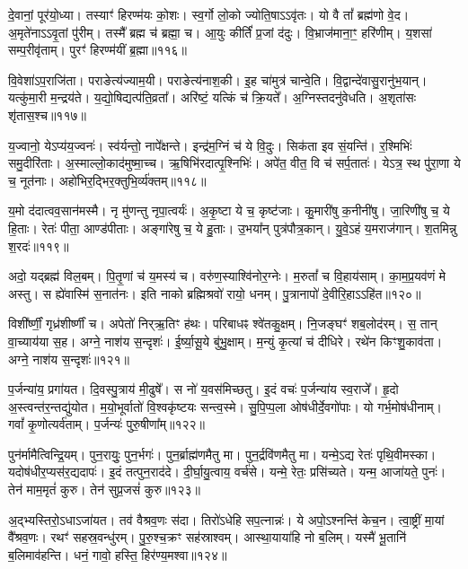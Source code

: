 दे॒वानां॒ पूर॑यो॒ध्या। तस्याꣳ॑ हिरण्म॑यः को॒शः। 
स्व॒र्गो लो॒को ज्योति॒षाऽऽवृ॑तः। यो वै तां᳚ ब्रह्म॑णो वे॒द। 
अ॒मृते॑नाऽऽवृ॒तां पु॑रीम्। तस्मै᳚ ब्रह्म च॑ ब्रह्मा॒ च। 
आ॒युः कीर्तिं॑ प्र॒जां द॑दुः। वि॒भ्राज॑माना॒ꣳ॒ हरि॑णीम्। 
य॒शसा॑ सम्प॒रीवृ॑ताम्। पुरꣳ॑ हिरण्म॑यीं ब्र॒ह्मा॥११६॥


वि॒वेशा॑ऽप॒राजि॑ता। पराङेत्य॑ज्याम॒यी। 
पराङेत्य॑नाश॒की। इ॒ह चा॑मुत्र॑ चान्वे॒ति। 
वि॒द्वान्दे॑वासु॒रानु॑भ॒यान्। यत्कु॑मा॒री म॒न्द्रय॑ते। 
य॒द्यो॒षिद्यत्प॑ति॒व्रता᳚। अरि॑ष्टं॒ यत्किं च॑ क्रि॒यते᳚। 
अ॒ग्निस्तदनु॑वेधति। अ॒शृता॑सः शृ॑तास॒श्च॥११७॥


य॒ज्वानो॒ येऽप्य॑य॒ज्वनः॑। स्व॑र्यन्तो॒ नापे᳚क्षन्ते। 
इन्द्र॑म॒ग्निं च॑ ये वि॒दुः। सिक॑ता इव सं॒यन्ति॑। 
र॒श्मिभिः॑ समु॒दीरि॑ताः। अ॒स्माल्लो॒काद॑मुष्मा॒च्च। 
ऋ॒षिभि॑रदात्पृ॒श्निभिः॑। 
अपे॑त॒ वीत॒ वि च॑ सर्प॒तातः॑। येऽत्र॒ स्थ पु॑रा॒णा ये च॒ नूत॑नाः। 
अहो॑भिर॒द्भिर॒क्तु\-भि॒र्व्य॑क्तम्॥११८॥


य॒मो द॑दात्वव॒सान॑मस्मै। नृ मु॑णन्तु नृपा॒त्वर्यः॑। 
अ॒कृ॒ष्टा ये च॒ कृष्ट॑जाः। कु॒मारी॑षु क॒नीनी॑षु। 
जा॒रिणी॑षु च॒ ये हि॒ताः। रेतः॑ पीता॒ आण्ड॑पीताः। 
अङ्गा॑रेषु च॒ ये हु॒ताः। उ॒भया᳚न्‌ पुत्र॑पौत्र॒कान्। 
यु॒वे॒ऽहं य॒मराज॑गान्। श॒तमिन्नु श॒रदः॑॥११९॥


अदो॒ यद्ब्रह्म॑ विल॒बम्। पि॒तृ॒णां च॑ य॒मस्य॑ च। 
वरु॑ण॒स्याश्वि॑नोर॒ग्नेः। म॒रुतां᳚ च वि॒हाय॑साम्। 
का॒म॒प्र॒यव॑णं मे अस्तु। स ह्ये॑वास्मि॑ स॒नात॑नः। 
इति नाको ब्रह्मिश्रवो॑ रायो॒ धनम्। पु॒त्रानापो॑ दे॒वीरि॒हाऽऽहि॑त॥१२०॥\anuvakamend


विशी᳚र्ष्णीं॒ गृध्र॑शीर्ष्णीं च। अपेतो॑ निर्‌ऋ॒तिꣳ ह॑थः। 
परिबाधꣴ श्वे॑तकु॒क्षम्। नि॒जङ्घꣳ॑ शब॒लोद॑रम्। 
स॒ तान्‌ वा॒च्याय॑या स॒ह। अग्ने॒ नाश॑य स॒न्दृशः॑। 
ई॒र्ष्या॒सू॒ये बु॑भु॒क्षाम्। म॒न्युं कृ॒त्यां च॑ दीधिरे। 
रथे॑न किꣳशु॒काव॑ता। अग्ने॒ नाश॑य स॒न्दृशः॑॥१२१॥\anuvakamend


प॒र्जन्या॑य॒ प्रगा॑यत। दि॒वस्पु॒त्राय॑ मी॒ढुषे᳚। 
स नो॑ य॒वस॑मिच्छतु। इ॒दं वचः॑ प॒र्जन्या॑य स्व॒राजे᳚। 
हृ॒दो अ॒स्त्वन्त॑र॒न्तद्यु॑योत। म॒यो॒भूर्वातो॑ वि॒श्वकृ॑ष्टयः सन्त्व॒स्मे। 
सु॒पि॒प्प॒ला ओष॑धीर्दे॒वगो॑पाः। यो गर्भ॒मोष॑धीनाम्। 
गवां᳚ कृ॒णोत्यर्व॑ताम्। प॒र्जन्यः॑ पुरु॒षीणा᳚म्॥१२२॥\anuvakamend


पुन॑र्मामैत्विन्द्रि॒यम्। पुन॒रायुः॒ पुन॒र्भगः॑। 
पुन॒र्ब्राह्म॑णमैतु मा। पुन॒र्द्रवि॑णमैतु मा। 
यन्मे॒ऽद्य रेतः॑ पृथि॒वीमस्का\sn{}। यदोष॑धीर॒प्यस॑र॒द्यदापः॑। 
इ॒दं तत्पुन॒राद॑दे। दी॒र्घा॒यु॒त्वाय॒ वर्च॑से। 
यन्मे॒ रेतः॒ प्रसि॑च्यते। यन्म॒ आजा॑यते॒ पुनः॑। 
तेन॑ माम॒मृतं॑ कुरु। तेन॑ सुप्र॒जसं॑ कुरु॥१२३॥\anuvakamend


अ॒द्भ्यस्तिरो॒ऽधाऽजा॑यत। तव॑ वैश्रव॒णः स॑दा। 
तिरो॑ऽधेहि सप॒त्नान्नः॑। ये अपो॒ऽश्नन्ति॑ केच॒न। 
त्वा॒ष्ट्रीं मा॒यां वै᳚श्रव॒णः। रथꣳ॑ सहस्र॒वन्धु॑रम्। 
पु॒रु॒श्च॒क्रꣳ सह॑स्राश्वम्। आस्था॒याया॑हि नो ब॒लिम्। 
यस्मै॑ भू॒तानि॑ ब॒लिमाव॑हन्ति। धनं॒ गावो॒ हस्ति॒ हिर॑ण्य॒मश्वा\sn{}॥१२४॥


